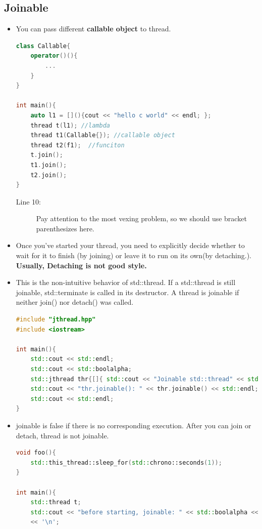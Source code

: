 \documentclass[a4paper,11pt,twoside]{book}
\begin{document}
\subsection{Joinable}
\begin{itemize}
	\item You can pass different \textbf{callable object} to thread. 
\begin{lstlisting}[frame=single, language=c++]
class Callable{
	operator()(){
		...
	}
}

int main(){
	auto l1 = [](){cout << "hello c world" << endl; };
	thread t(l1); //lambda
	thread t1(Callable{}); //callable object
	thread t2(f1);  //funciton
	t.join();
	t1.join();
	t2.join();
}
\end{lstlisting}

\begin{description}
	\item[Line 10:] Pay attention to the most vexing problem, so we should use bracket parenthesizes here.  
\end{description}

	\item Once you've started your thread, you  need to explicitly decide whether to wait for it to finish (by joining) or leave it to run on its own(by detaching.). \textbf{Usually, Detaching is not good style.}
	
	\item This is the non-intuitive behavior of std::thread. If a std::thread is still joinable, std::terminate is called in its destructor. A thread is joinable if neither join() nor detach() was called.
	
\begin{lstlisting}[frame=single, language=c++]
#include "jthread.hpp"
#include <iostream>

int main(){	
	std::cout << std::endl;
	std::cout << std::boolalpha;
	std::jthread thr{[]{ std::cout << "Joinable std::thread" << std::endl; }};
	std::cout << "thr.joinable(): " << thr.joinable() << std::endl;	
	std::cout << std::endl;
}
\end{lstlisting}

	
	\item joinable is false if there is no corresponding execution. After you can join or detach, thread is not joinable.
\begin{lstlisting}[frame=single, language=c++]
void foo(){
	std::this_thread::sleep_for(std::chrono::seconds(1));
}

int main(){
	std::thread t;
	std::cout << "before starting, joinable: " << std::boolalpha << t.joinable()
	<< '\n';
	

\end{lstlisting}
\end{itemize}
\end{document}
